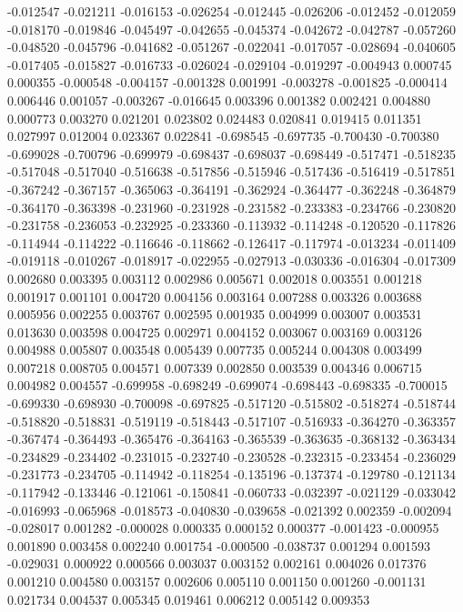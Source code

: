 -0.012547
-0.021211
-0.016153
-0.026254
-0.012445
-0.026206
-0.012452
-0.012059
-0.018170
-0.019846
-0.045497
-0.042655
-0.045374
-0.042672
-0.042787
-0.057260
-0.048520
-0.045796
-0.041682
-0.051267
-0.022041
-0.017057
-0.028694
-0.040605
-0.017405
-0.015827
-0.016733
-0.026024
-0.029104
-0.019297
-0.004943
0.000745
0.000355
-0.000548
-0.004157
-0.001328
0.001991
-0.003278
-0.001825
-0.000414
0.006446
0.001057
-0.003267
-0.016645
0.003396
0.001382
0.002421
0.004880
0.000773
0.003270
0.021201
0.023802
0.024483
0.020841
0.019415
0.011351
0.027997
0.012004
0.023367
0.022841
-0.698545
-0.697735
-0.700430
-0.700380
-0.699028
-0.700796
-0.699979
-0.698437
-0.698037
-0.698449
-0.517471
-0.518235
-0.517048
-0.517040
-0.516638
-0.517856
-0.515946
-0.517436
-0.516419
-0.517851
-0.367242
-0.367157
-0.365063
-0.364191
-0.362924
-0.364477
-0.362248
-0.364879
-0.364170
-0.363398
-0.231960
-0.231928
-0.231582
-0.233383
-0.234766
-0.230820
-0.231758
-0.236053
-0.232925
-0.233360
-0.113932
-0.114248
-0.120520
-0.117826
-0.114944
-0.114222
-0.116646
-0.118662
-0.126417
-0.117974
-0.013234
-0.011409
-0.019118
-0.010267
-0.018917
-0.022955
-0.027913
-0.030336
-0.016304
-0.017309
0.002680
0.003395
0.003112
0.002986
0.005671
0.002018
0.003551
0.001218
0.001917
0.001101
0.004720
0.004156
0.003164
0.007288
0.003326
0.003688
0.005956
0.002255
0.003767
0.002595
0.001935
0.004999
0.003007
0.003531
0.013630
0.003598
0.004725
0.002971
0.004152
0.003067
0.003169
0.003126
0.004988
0.005807
0.003548
0.005439
0.007735
0.005244
0.004308
0.003499
0.007218
0.008705
0.004571
0.007339
0.002850
0.003539
0.004346
0.006715
0.004982
0.004557
-0.699958
-0.698249
-0.699074
-0.698443
-0.698335
-0.700015
-0.699330
-0.698930
-0.700098
-0.697825
-0.517120
-0.515802
-0.518274
-0.518744
-0.518820
-0.518831
-0.519119
-0.518443
-0.517107
-0.516933
-0.364270
-0.363357
-0.367474
-0.364493
-0.365476
-0.364163
-0.365539
-0.363635
-0.368132
-0.363434
-0.234829
-0.234402
-0.231015
-0.232740
-0.230528
-0.232315
-0.233454
-0.236029
-0.231773
-0.234705
-0.114942
-0.118254
-0.135196
-0.137374
-0.129780
-0.121134
-0.117942
-0.133446
-0.121061
-0.150841
-0.060733
-0.032397
-0.021129
-0.033042
-0.016993
-0.065968
-0.018573
-0.040830
-0.039658
-0.021392
0.002359
-0.002094
-0.028017
0.001282
-0.000028
0.000335
0.000152
0.000377
-0.001423
-0.000955
0.001890
0.003458
0.002240
0.001754
-0.000500
-0.038737
0.001294
0.001593
-0.029031
0.000922
0.000566
0.003037
0.003152
0.002161
0.004026
0.017376
0.001210
0.004580
0.003157
0.002606
0.005110
0.001150
0.001260
-0.001131
0.021734
0.004537
0.005345
0.019461
0.006212
0.005142
0.009353
